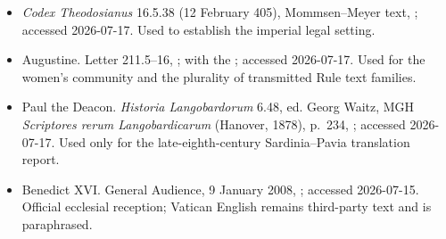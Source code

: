 \begin{itemize}
CSEL 104 (Berlin/Boston, 2018),
; accessed 2026-07-17. Used for the representatives and dossier
architecture, not as neutral or complete proceedings.
\item \emph{Codex Theodosianus} 16.5.38 (12 February 405), Mommsen--Meyer
text,
; accessed 2026-07-17. Used to establish the imperial legal setting.
\item Augustine. Letter 211.5--16,
; with the
; accessed 2026-07-17. Used for the women's
community and the plurality of transmitted Rule text families.
\item Paul the Deacon. \emph{Historia Langobardorum} 6.48, ed. Georg Waitz,
MGH \emph{Scriptores rerum Langobardicarum} (Hanover, 1878), p.~234,
; accessed 2026-07-17. Used only for
the late-eighth-century Sardinia--Pavia translation report.
\item Benedict XVI\@. General Audience, 9 January 2008,
;
accessed 2026-07-15. Official ecclesial reception; Vatican English remains
third-party text and is paraphrased.
\end{itemize}
